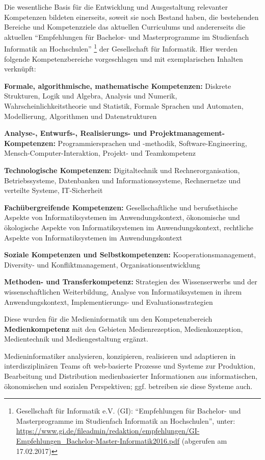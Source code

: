 Die wesentliche Basis für die Entwicklung und Ausgestaltung relevanter
Kompetenzen bildeten einerseits, soweit sie noch Bestand haben, die
bestehenden Bereiche und Kompetenzziele das aktuellen Curriculums und
andererseits die aktuellen ``Empfehlungen für Bachelor- und
Masterprogramme im Studienfach Informatik an Hochschulen'' \footnote{Gesellschaft
  für Informatik e.V. (GI): ``Empfehlungen für Bachelor- und
  Masterprogramme im Studienfach Informatik an Hochschulen'', unter:
  \url{https://www.gi.de/fileadmin/redaktion/empfehlungen/GI-Empfehlungen_Bachelor-Master-Informatik2016.pdf}
  (abgerufen am 17.02.2017)} der Gesellschaft für Informatik. Hier
werden folgende Kompetenzbereiche vorgeschlagen und mit exemplarischen
Inhalten verknüpft:

\textbf{Formale, algorithmische, mathematische Kompetenzen:} Diskrete
Strukturen, Logik und Algebra, Analysis und Numerik,
Wahrscheinlichkeitstheorie und Statistik, Formale Sprachen und
Automaten, Modellierung, Algorithmen und Datenstrukturen

\textbf{Analyse-, Entwurfs-, Realisierungs- und
Projektmanagement-Kompetenzen:} Programmiersprachen und -methodik,
Software-Engineering, Mensch-Computer-Interaktion, Projekt- und
Teamkompetenz

\textbf{Technologische Kompetenzen:} Digitaltechnik und
Rechnerorganisation, Betriebssysteme, Datenbanken und
Informationssysteme, Rechnernetze und verteilte Systeme, IT-Sicherheit

\textbf{Fachübergreifende Kompetenzen:} Gesellschaftliche und
berufsethische Aspekte von Informatiksystemen im Anwendungskontext,
ökonomische und ökologische Aspekte von Informatiksystemen im
Anwendungskontext, rechtliche Aspekte von Informatiksystemen im
Anwendungskontext

\textbf{Soziale Kompetenzen und Selbstkompetenzen:}
Kooperationsmanagement, Diversity- und Konfliktmanagement,
Organisationsentwicklung

\textbf{Methoden- und Transferkompetenz:} Strategien des Wissenserwerbs
und der wissenschaftlichen Weiterbildung, Analyse von Informatiksystemen
in ihrem Anwendungskontext, Implementierungs- und Evaluationsstrategien

Diese wurden für die Medieninformatik um den Kompetenzbereich
\textbf{Medienkompetenz} mit den Gebieten Medienrezeption,
Medienkonzeption, Medientechnik und Mediengestaltung ergänzt.

Medieninformatiker analysieren, konzipieren, realisieren und adaptieren
in interdisziplinären Teams oft web-basierte Prozesse und Systeme zur
Produktion, Bearbeitung und Distribution medienbasierter Informationen
aus informatischen, ökonomischen und sozialen Perspektiven; ggf.
betreiben sie diese Systeme auch.

